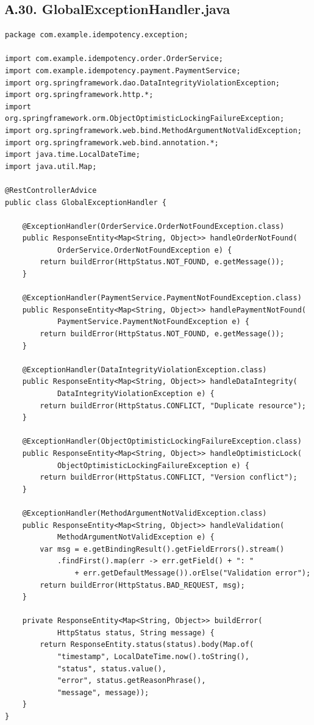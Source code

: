\subsection*{А.30. GlobalExceptionHandler.java}
\begin{lstlisting}[caption={GlobalExceptionHandler.java --- глобальная обработка ошибок}]
package com.example.idempotency.exception;

import com.example.idempotency.order.OrderService;
import com.example.idempotency.payment.PaymentService;
import org.springframework.dao.DataIntegrityViolationException;
import org.springframework.http.*;
import org.springframework.orm.ObjectOptimisticLockingFailureException;
import org.springframework.web.bind.MethodArgumentNotValidException;
import org.springframework.web.bind.annotation.*;
import java.time.LocalDateTime;
import java.util.Map;

@RestControllerAdvice
public class GlobalExceptionHandler {

    @ExceptionHandler(OrderService.OrderNotFoundException.class)
    public ResponseEntity<Map<String, Object>> handleOrderNotFound(
            OrderService.OrderNotFoundException e) {
        return buildError(HttpStatus.NOT_FOUND, e.getMessage());
    }

    @ExceptionHandler(PaymentService.PaymentNotFoundException.class)
    public ResponseEntity<Map<String, Object>> handlePaymentNotFound(
            PaymentService.PaymentNotFoundException e) {
        return buildError(HttpStatus.NOT_FOUND, e.getMessage());
    }

    @ExceptionHandler(DataIntegrityViolationException.class)
    public ResponseEntity<Map<String, Object>> handleDataIntegrity(
            DataIntegrityViolationException e) {
        return buildError(HttpStatus.CONFLICT, "Duplicate resource");
    }

    @ExceptionHandler(ObjectOptimisticLockingFailureException.class)
    public ResponseEntity<Map<String, Object>> handleOptimisticLock(
            ObjectOptimisticLockingFailureException e) {
        return buildError(HttpStatus.CONFLICT, "Version conflict");
    }

    @ExceptionHandler(MethodArgumentNotValidException.class)
    public ResponseEntity<Map<String, Object>> handleValidation(
            MethodArgumentNotValidException e) {
        var msg = e.getBindingResult().getFieldErrors().stream()
            .findFirst().map(err -> err.getField() + ": "
                + err.getDefaultMessage()).orElse("Validation error");
        return buildError(HttpStatus.BAD_REQUEST, msg);
    }

    private ResponseEntity<Map<String, Object>> buildError(
            HttpStatus status, String message) {
        return ResponseEntity.status(status).body(Map.of(
            "timestamp", LocalDateTime.now().toString(),
            "status", status.value(),
            "error", status.getReasonPhrase(),
            "message", message));
    }
}
\end{lstlisting}

